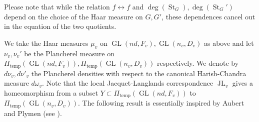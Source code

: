 \documentclass[11pt]{article}
\theoremstyle{plain}
\theoremstyle{remark}
\theoremstyle{definition}
\DeclareMathOperator{\GL}{GL}
\DeclareMathOperator{\St}{St}
\DeclareMathOperator{\JL}{JL}
\DeclareMathOperator{\tp}{temp}
\begin{document}
Please note that while the relation $f\leftrightarrow f$ and $\deg(\St_G),\deg(\St_G')$ depend on the choice of the Haar measure on $G,G'$, these dependences cancel out in the equation of the two quotients. 
 
We take the Haar measures $\mu_v$ on $\GL(nd,F_v),\GL(n_v,D_v)$ as above and let $\nu_v,\nu_v'$ be the Plancherel measure on $\Pi_{\tp}(\GL(nd,F_v)),\Pi_{\tp}(\GL(n_v,D_v))$ respectively. 
We denote by $d \nu_v,d \nu'_v$ the Plancherel densities with respect to the canonical Harish-Chandra measure $d \omega_v$.
Note that the local Jacquet-Langlands correspondence $\JL_v$ gives a homeomorphism from a subset $Y\subset \Pi_{\tp}(\GL(nd,F_v))$ to $\Pi_{\tp}(\GL(n_v,D_v))$.  
The following result is essentially inspired by Aubert and Plymen (see \cite[Theorem 7.2]{AubtPlm05}). 
 
\end{document}
